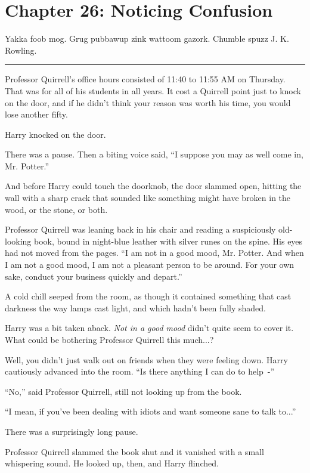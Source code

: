 \chapter{Chapter 26: Noticing Confusion}
Yakka foob mog. Grug pubbawup zink wattoom gazork. Chumble spuzz J. K. Rowling.

\begin{center}\rule{3in}{0.4pt}\end{center}

Professor Quirrell's office hours consisted of 11:40 to 11:55 AM on Thursday. That was for all of his students in all years. It cost a Quirrell point just to knock on the door, and if he didn't think your reason was worth his time, you would lose another fifty.

Harry knocked on the door.

There was a pause. Then a biting voice said, ``I suppose you may as well come in, Mr. Potter.''

And before Harry could touch the doorknob, the door slammed open, hitting the wall with a sharp crack that sounded like something might have broken in the wood, or the stone, or both.

Professor Quirrell was leaning back in his chair and reading a suspiciously old-looking book, bound in night-blue leather with silver runes on the spine. His eyes had not moved from the pages. ``I am not in a good mood, Mr. Potter. And when I am not a good mood, I am not a pleasant person to be around. For your own sake, conduct your business quickly and depart.''

A cold chill seeped from the room, as though it contained something that cast darkness the way lamps cast light, and which hadn't been fully shaded.

Harry was a bit taken aback. \emph{Not in a good mood} didn't quite seem to cover it. What could be bothering Professor Quirrell this much...?

Well, you didn't just walk out on friends when they were feeling down. Harry cautiously advanced into the room. ``Is there anything I can do to help~-''

``No,'' said Professor Quirrell, still not looking up from the book.

``I mean, if you've been dealing with idiots and want someone sane to talk to...''

There was a surprisingly long pause.

Professor Quirrell slammed the book shut and it vanished with a small whispering sound. He looked up, then, and Harry flinched.

